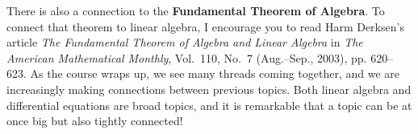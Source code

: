 \documentclass{homework}
\begin{document}
There is also a connection to the \textbf{Fundamental Theorem of
  Algebra}.  To connect that theorem to linear algebra, I encourage
you to read Harm Derksen's article \textit{The Fundamental Theorem of
  Algebra and Linear Algebra} in \textit{The American Mathematical
  Monthly}, Vol.~110, No.~7 (Aug.--Sep., 2003), pp. 620--623.
As the course wraps up, we see many threads coming together, and we
are increasingly making connections between previous topics.  Both
linear algebra and differential equations are broad topics, and it is
remarkable that a topic can be at once big but also tightly connected!
\end{document}
